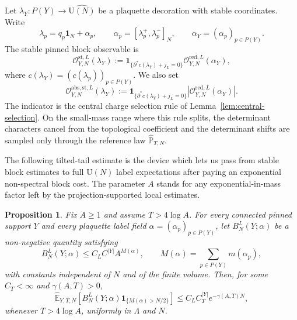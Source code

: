 \documentclass[11pt,a4paper,reqno]{amsart}
\newtheorem{proposition}[theorem]{Proposition}
\theoremstyle{definition}
\theoremstyle{remark}
\newcommand\U{{\mathrm U}}
\newcommand\E{{\mathbb E}}
\newcommand\Pbb{{\mathbb{P}}}
\begin{document}
Let $\lambda_Y:P(Y)\to\widehat{\U(N)}$ be a plaquette decoration with stable coordinates.  Write
\[
\lambda_p=q_p\mathbf 1_N+\alpha_p,\qquad\alpha_p=[\lambda_p^+,\lambda_p^-]_N,\qquad\alpha_Y=(\alpha_p)_{p\in P(Y)}.
\]
The stable pinned block observable is
\begin{equation}\label{eq:hk-block-observable}
\mathcal O_{Y,N}^{\mathrm{st},L}(\lambda_Y)
:=
\mathbf 1_{\{\partial^*c(\lambda_Y)+j_L=0\}}
\mathcal O_{Y,N}^{\mathrm{red},L}(\alpha_Y),
\end{equation}
where $c(\lambda_Y)=(c(\lambda_p))_{p\in P(Y)}$.  We also set
\[
\mathcal O_{Y,N}^{\mathrm{abs},\mathrm{st},L}(\lambda_Y)
:=
\mathbf 1_{\{\partial^*c(\lambda_Y)+j_L=0\}}
\left|\mathcal O_{Y,N}^{\mathrm{red},L}(\alpha_Y)\right|.
\]
The indicator is the central charge selection rule of Lemma~\ref{lem:central-selection}.  On the small-mass range where this rule splits, the determinant characters cancel from the topological coefficient and the determinant shifts are sampled only through the reference law $\widehat\Pbb_{T,N}$.



The following tilted-tail estimate is the device which lets us pass from stable block estimates to full $\U(N)$ label expectations after paying an exponential non-spectral block cost.  The parameter $A$ stands for any exponential-in-mass factor left by the projection-supported local estimates.

\begin{proposition}\label{prop:nonstable-polymer-tail}
Fix $A\ge1$ and assume $T>4\log A$.  For every connected pinned support $Y$ and every plaquette label field $\alpha=(\alpha_p)_{p\in P(Y)}$, let $B_N^L(Y;\alpha)$ be a non-negative quantity satisfying
\begin{equation}
\label{eq:nonspectral-growth-assumption}
B_N^L(Y;\alpha)
\le
C_LC^{|Y|}A^{M(\alpha)},
\qquad
M(\alpha)=\sum_{p\in P(Y)}m(\alpha_p),
\end{equation}
with constants independent of $N$ and of the finite volume.  Then, for some $C_T<\infty$ and $\gamma(A,T)>0$,
\begin{equation}\label{eq:nonstable-polymer-tail-under-P}
\widehat\E_{Y,T,N}\left[
B_N^L(Y;\alpha)
\mathbf 1_{\{M(\alpha)>N/2\}}
\right]
\le
C_L C_T^{|Y|}e^{-\gamma(A,T)N},
\end{equation}
whenever $T>4\log A$, uniformly in $\Lambda$ and $N$.
\end{proposition}
\end{document}
